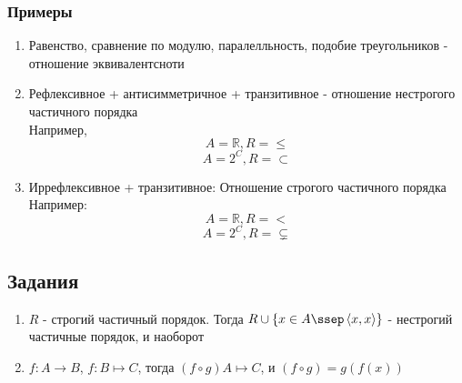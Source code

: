 \documentclass[11pt, oneside]{article}   	%
\begin{document}
        \subsubsection{Примеры}
            \begin{enumerate}
                \item Равенство, сравнение по модулю, паралелльность, подобие треугольников - отношение эквивалентсноти
                \item Рефлексивное + антисимметричное + транзитивное - отношение нестрогого частичного порядка\\
                Например, 
                \[A=\mathbb{R}, R = \le\]
                \[A=2^C,  R = \subset\]
                \item Иррефлексивное + транзитивное: Отношение строгого частичного порядка\\
                    Например: 
                    \[A=\mathbb{R}, R = <\]
                    \[A=2^C, R = \subsetneq\] 
            \end{enumerate} 
    \subsection{Задания}
        \begin{enumerate}
            \item $R$ - строгий частичный порядок. Тогда  $R\cup \{x \in A\ssep\left<x, x\right>\} $ - нестрогий частичные порядок, и наоборот
            \item $f: A \to B$, $f: B \mapsto C$, тогда $(f \circ g) A \mapsto C$, и $(f \circ g) = g(f(x))$
        \end{enumerate}
         
\end{document}
